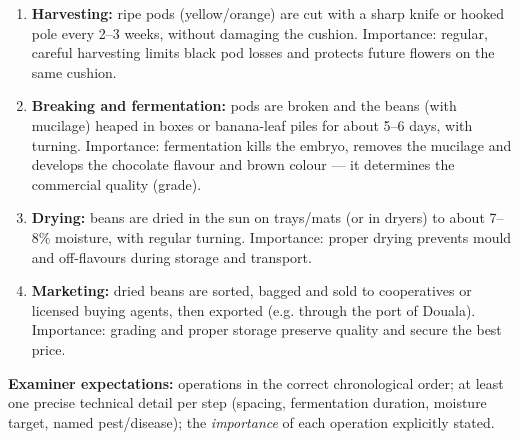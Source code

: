 \documentclass[11pt]{article}
\begin{document}
\begin{corrige}
\begin{enumerate}
\begin{itemize}
\item \emph{Pest and disease control:} capsids (mirids) controlled with recommended insecticides; black pod disease (\emph{Phytophthora}) controlled by regular harvesting of ripe pods, removal of diseased pods, pruning for aeration and copper-based fungicides.
\item \emph{Fertiliser application:} NPK fertiliser maintains yield on old or exhausted soils.
\end{itemize}
\item \textbf{Harvesting:} ripe pods (yellow/orange) are cut with a sharp knife or hooked pole every 2--3 weeks, without damaging the cushion. Importance: regular, careful harvesting limits black pod losses and protects future flowers on the same cushion.
\item \textbf{Breaking and fermentation:} pods are broken and the beans (with mucilage) heaped in boxes or banana-leaf piles for about 5--6 days, with turning. Importance: fermentation kills the embryo, removes the mucilage and develops the chocolate flavour and brown colour — it determines the commercial quality (grade).
\item \textbf{Drying:} beans are dried in the sun on trays/mats (or in dryers) to about 7--8\% moisture, with regular turning. Importance: proper drying prevents mould and off-flavours during storage and transport.
\item \textbf{Marketing:} dried beans are sorted, bagged and sold to cooperatives or licensed buying agents, then exported (e.g. through the port of Douala). Importance: grading and proper storage preserve quality and secure the best price.
\end{enumerate}
\textbf{Examiner expectations:} operations in the correct chronological order; at least one precise technical detail per step (spacing, fermentation duration, moisture target, named pest/disease); the \emph{importance} of each operation explicitly stated.
\end{corrige}
\end{document}
